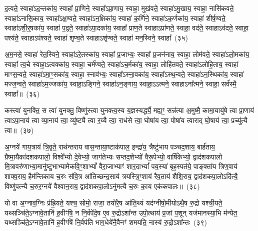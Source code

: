 {{\anuvakamend[{सं॒ वर्\mbox{}ष॑ते॒ रैभी᳚भ्यः॒ स्वाहा॒ द्वे च॑}]}%

द॒त्वते॒ स्वाहा॑\-ऽद॒न्तका॑य॒ स्वाहा᳚ प्रा॒णिने॒ स्वाहा᳚\-ऽप्रा॒णाय॒ स्वाहा॒ मुख॑वते॒ स्वाहा॑\-ऽमु॒खाय॒ स्वाहा॒ नासि॑कवते॒ स्वाहा॑\-ऽनासि॒काय॒ स्वाहा᳚\-ऽक्ष॒ण्वते॒ स्वाहा॑\-ऽन॒क्षिका॑य॒ स्वाहा॑ क॒र्णिने॒ स्वाहा॑\-ऽक॒र्णका॑य॒ स्वाहा॑ शीर्\mbox{}ष॒ण्वते॒ स्वाहा॑\-ऽ\-शी॒र्॒\mbox{}षका॑य॒ स्वाहा॑ प॒द्वते॒ स्वाहा॑\-ऽपा॒दका॑य॒ स्वाहा᳚ प्राण॒ते स्वाहा\-ऽप्रा॑णते॒ स्वाहा॒ वद॑ते॒ स्वाहा\-ऽव॑दते॒ स्वाहा॒ पश्य॑ते॒ स्वाहा\-ऽप॑श्यते॒ स्वाहा॑ शृण्व॒ते स्वाहा\-ऽशृ॑ण्वते॒ स्वाहा॑ मन॒स्विने॒ स्वाहा᳚~(३५)

अ॒म॒नसे॒ स्वाहा॑ रेत॒स्विने॒ स्वाहा॑\-ऽरे॒तस्का॑य॒ स्वाहा᳚ प्र॒जाभ्यः॒ स्वाहा᳚ प्र॒जन॑नाय॒ स्वाहा॒ लोम॑वते॒ स्वाहा॑\-ऽलो॒मका॑य॒ स्वाहा᳚ त्व॒चे स्वाहा॒\-ऽत्वक्का॑य॒ स्वाहा॒ चर्म॑ण्वते॒ स्वाहा॑\-ऽच॒र्मका॑य॒ स्वाहा॒ लोहि॑तवते॒ स्वाहा॑\-ऽलोहि॒ताय॒ स्वाहा॑ माꣳस॒न्वते॒ स्वाहा॑\-ऽमा॒ꣳ॒सका॑य॒ स्वाहा॒ स्नाव॑भ्यः॒ स्वाहा᳚\-ऽस्ना॒वका॑य॒ स्वाहा᳚\-ऽस्थ॒न्वते॒ स्वाहा॑\-ऽन॒स्थिका॑य॒ स्वाहा॑ मज्ज॒न्वते॒ स्वाहा॑\-ऽम॒ज्जका॑य॒ स्वाहा॒\-ऽङ्गिने॒ स्वाहा॑\-ऽन॒ङ्गाय॒ स्वाहा॒\-ऽऽ\-त्मने॒ स्वाहा\-ऽना᳚त्मने॒ स्वाहा॒ सर्व॑स्मै॒ स्वाहा᳚॥~(३६)

{\anuvakamend[{म॒न॒स्विने॒ स्वाहा\-ऽना᳚त्मने॒ स्वाहा॒ द्वे च॑}]}%

कस्त्वा॑ युनक्ति॒ स त्वा॑ युनक्तु॒ विष्णु॑स्त्वा युनक्त्व॒स्य य॒ज्ञस्यर्द्ध्यै॒ मह्य॒ꣳ॒ सन्न॑त्या अ॒मुष्मै॒ कामा॒यायु॑षे त्वा प्रा॒णाय॑ त्वा\-ऽपा॒नाय॑ त्वा व्या॒नाय॑ त्वा॒ व्यु॑ष्ट्यै त्वा र॒य्यै त्वा॒ राध॑से त्वा॒ घोषा॑य त्वा॒ पोषा॑य त्वाराद् घो॒षाय॑ त्वा॒ प्रच्यु॑त्यै त्वा॥~(३७)

{\anuvakamend[{कस्त्वा॒\-ऽष्टात्रिꣳ॑शत्}]}%

अ॒ग्नये॑ गाय॒त्राय॑ त्रि॒वृते॒ राथ॑न्तराय वास॒न्ताया॒ष्टाक॑पाल॒ इन्द्रा॑य॒ त्रैष्टु॑भाय पञ्चद॒शाय॒ बार्\mbox{}ह॑ताय॒ ग्रैष्मा॒यैका॑\-दश\-कपालो॒ विश्वे᳚भ्यो दे॒वेभ्यो॒ जाग॑तेभ्यः सप्तद॒शेभ्यो॑ वैरू॒पेभ्यो॒ वार्\mbox{}षि॑केभ्यो॒ द्वाद॑श\-कपालो मि॒त्रावरु॑णाभ्या॒मानु॑ष्टुभाभ्यामेक\-वि॒ꣳ॒शा\-भ्यां᳚ वैरा॒जाभ्याꣳ॑ शार॒दा\-भ्यां᳚ पय॒स्या॑ बृह॒स्पत॑ये॒ पाङ्क्ता॑य त्रिण॒वाय॑ शाक्व॒राय॒ हैम॑न्तिकाय च॒रुः स॑वि॒त्र आ॑तिच्छन्द॒साय॑ त्रयस्त्रि॒ꣳ॒शाय॑ रैव॒ताय॑ शैशि॒राय॒ द्वाद॑श\-कपा॒लो\-ऽदि॑त्यै॒ विष्णु॑पत्न्यै च॒रुर॒ग्नये॑ वैश्वान॒राय॒ द्वाद॑श\-कपा॒लो\-ऽनु॑मत्यै च॒रुः का॒य एक॑कपालः॥~(३८)

{\anuvakamend[{अ॒ग्नये\-ऽदि॑त्या॒ अनु॑मत्यै स॒प्तच॑त्वारिꣳशत्}]}%

यो वा अ॒ग्नाव॒ग्निः प्र॑ह्रि॒यते॒ यश्च॒ सोमो॒ राजा॒ तयो॑रे॒ष आ॑ति॒थ्यं यद॑ग्नीषो॒मीयो\-ऽथै॒ष रु॒द्रो यश्ची॒यते॒ यथ्सञ्चि॑ते॒\-ऽग्नावे॒तानि॑ ह॒वीꣳषि॒ न नि॒र्वपे॑दे॒ष ए॒व रु॒द्रो\-ऽशा᳚न्त उपो॒त्थाय॑ प्र॒जां प॒शून् यज॑मानस्या॒भि म॑न्येत॒ यथ्सञ्चि॑ते॒\-ऽग्नावे॒तानि॑ ह॒वीꣳषि॑ नि॒र्वप॑ति भाग॒धेये॑नै॒वैनꣳ॑ शमयति॒ नास्य॑ रु॒द्रो\-ऽशा᳚न्तः~(३९)

}
